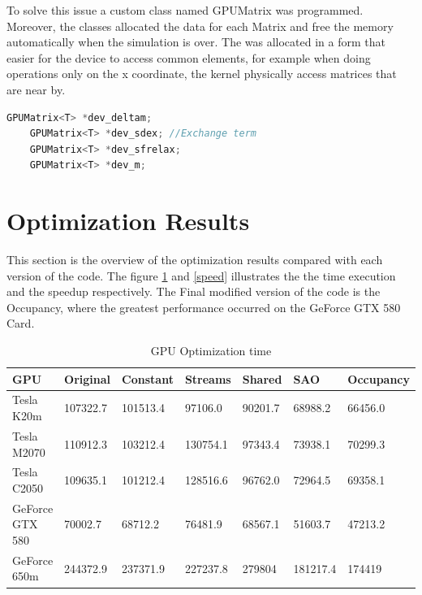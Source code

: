 To solve this issue a custom class named GPUMatrix was programmed. Moreover, the classes allocated the data for each Matrix and free the memory automatically when the simulation is over. The was allocated in a form that easier for the device to access common elements, for example when doing operations only on the x coordinate, the kernel physically access matrices that are near by.

\begin{lstlisting}[language=C++, caption={SOA implementation}]
    GPUMatrix<T> *dev_deltam;
    GPUMatrix<T> *dev_sdex; //Exchange term
    GPUMatrix<T> *dev_sfrelax;
    GPUMatrix<T> *dev_m; 
\end{lstlisting}


\section{Optimization Results}

This section is the overview of the optimization results compared with each version of the code. The figure \ref{tab:time} and \ref{speed} illustrates the the time execution and the speedup respectively. The Final modified version of the code is the Occupancy, where the greatest performance occurred on the GeForce GTX 580 Card.

\begin{table}[h]
\centering
  \begin{tabular} { |  l  |  l | l  |  l  | l | l | l |}
    \hline
    GPU & Original & Constant & Streams & Shared & SAO & Occupancy \\
    \hline
    Tesla K20m & 107322.7 & 101513.4 & 97106.0 & 90201.7 & 68988.2 & 66456.0\\
   \hline
    Tesla M2070 & 110912.3 & 103212.4 & 130754.1 & 97343.4 & 73938.1 & 70299.3\\
    \hline
    Tesla C2050 & 109635.1 & 101212.4 & 128516.6 & 96762.0 & 72964.5 & 69358.1\\
   \hline
    GeForce GTX 580 & 70002.7 & 68712.2 & 76481.9 & 68567.1 & 51603.7 & 47213.2\\
   \hline
    GeForce 650m & 244372.9 & 237371.9 & 227237.8 & 279804 & 181217.4 & 174419\\
   \hline
  \end{tabular}
    \caption{GPU Optimization time}
  \label{tab:time}
  \end{table}
  
